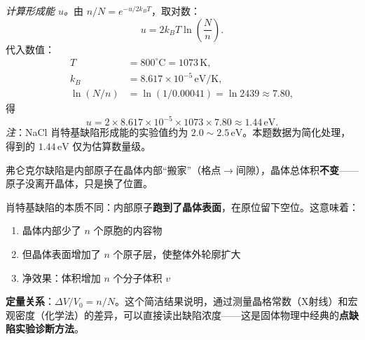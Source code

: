 \begin{derivationbox}[标准解题过程]
\textit{计算形成能 $u$。}由 $n/N = e^{-u/2k_{\!B}T}$，取对数：
\begin{equation}
u = 2k_{\!B}T\ln\!\left(\frac{N}{n}\right).
\end{equation}
代入数值：
\begin{align}
T &= 800^{\circ}\mathrm{C} = 1073\,\mathrm{K},\\
k_{\!B} &= 8.617\times 10^{-5}\,\mathrm{eV/K},\\
\ln(N/n) &= \ln(1/0.00041) = \ln 2439 \approx 7.80,
\end{align}
得
\begin{equation}
u = 2\times 8.617\times 10^{-5}\times 1073\times 7.80
\approx \boxed{1.44\,\mathrm{eV}}.
\end{equation}
\textit{注}：NaCl 肖特基缺陷形成能的实验值约为 $2.0\sim 2.5\,\mathrm{eV}$。本题数据为简化处理，得到的 $1.44\,\mathrm{eV}$ 仅为估算数量级。
\end{derivationbox}

\begin{insightbox}
弗仑克尔缺陷是内部原子在晶体内部``搬家''（格点$\to$间隙），晶体总体积\textbf{不变}——原子没离开晶体，只是换了位置。

肖特基缺陷的本质不同：内部原子\textbf{跑到了晶体表面}，在原位留下空位。这意味着：
\begin{enumerate}
    \item 晶体内部少了 $n$ 个原胞的内容物
    \item 但晶体表面增加了 $n$ 个原子层，使整体外轮廓扩大
    \item 净效果：体积增加 $n$ 个分子体积 $v$
\end{enumerate}
\textbf{定量关系}：$\Delta V/V_0 = n/N$。这个简洁结果说明，通过测量晶格常数（X射线）和宏观密度（化学法）的差异，可以直接读出缺陷浓度——这是固体物理中经典的\textbf{点缺陷实验诊断方法}。
\end{insightbox}

